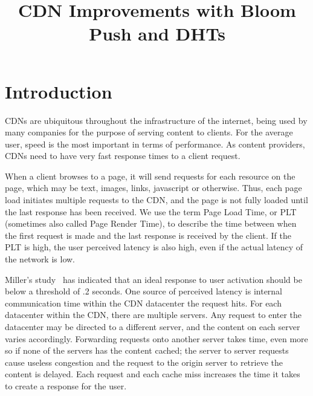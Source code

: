 \documentclass[conference]{IEEEtran}
\begin{document}
\title{CDN Improvements with Bloom Push and DHTs}

\author{
	\and
}

\maketitle
\thispagestyle{plain}
\pagestyle{plain}

\section{Introduction}\label{sec:intro}
CDNs are ubiquitous throughout the infrastructure of the internet, being used by many companies for the purpose of serving content to clients. For the average user, speed is the most important in terms of performance. As content providers, CDNs need to have very fast response times to a client request.

When a client browses to a page, it will send requests for each resource on the page, which may be text, images, links, javascript or otherwise. Thus, each page load initiates multiple requests to the CDN, and the page is not fully loaded until the last response has been received. We use the term Page Load Time, or PLT (sometimes also called Page Render Time), to describe the time between when the first request is made and the last response is received by the client. If the PLT is high, the user perceived latency is also high, even if the actual latency of the network is low. 

Miller’s study~\cite{MillerResponseTime} has indicated that an ideal response to user activation should be below a threshold of .2 seconds. One source of perceived latency is internal communication time within the CDN datacenter the request hits. 
For each datacenter within the CDN, there are multiple servers. Any request to enter the datacenter may be directed to a different server, and the content on each server varies accordingly. Forwarding requests onto another server takes time, even more so if none of the servers has the content cached; the server to server requests cause useless congestion and the request to the origin server to retrieve the content is delayed. Each request and each cache miss increases the time it takes to create a response for the user. 
\end{document}
